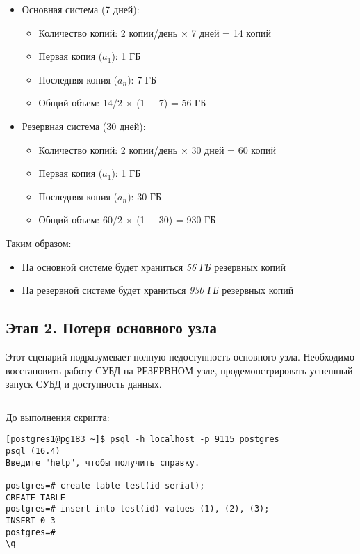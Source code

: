 \begin{itemize}
    \item Основная система (7 дней):
    \begin{itemize}
        \item Количество копий: 2 копии/день $\times$ 7 дней = 14 копий
        \item Первая копия (\(a_1\)): 1 ГБ
        \item Последняя копия (\(a_n\)): 7 ГБ
        \item Общий объем: 14/2 $\times$ (1 + 7) = 56 ГБ
    \end{itemize}
    
    \item Резервная система (30 дней):
    \begin{itemize}
        \item Количество копий: 2 копии/день $\times$ 30 дней = 60 копий
        \item Первая копия (\(a_1\)): 1 ГБ
        \item Последняя копия (\(a_n\)): 30 ГБ
        \item Общий объем: 60/2 $\times$ (1 + 30) = 930 ГБ
    \end{itemize}
\end{itemize}

Таким образом:
\begin{itemize}
    \item На основной системе будет храниться \emph{56 ГБ} резервных копий
    \item На резервной системе будет храниться \emph{930 ГБ} резервных копий
\end{itemize}

\subsection{Этап 2. Потеря основного узла}

Этот сценарий подразумевает полную недоступность основного узла. Необходимо восстановить работу СУБД на РЕЗЕРВНОМ узле, продемонстрировать успешный запуск СУБД и доступность данных.

\inputminted[breaklines,linenos,frame=single]{bash}{restore.sh}

До выполнения скрипта:

\begin{verbatim}
[postgres1@pg183 ~]$ psql -h localhost -p 9115 postgres
psql (16.4)
Введите "help", чтобы получить справку.

postgres=# create table test(id serial);
CREATE TABLE
postgres=# insert into test(id) values (1), (2), (3);
INSERT 0 3
postgres=#
\q
\end{verbatim}

